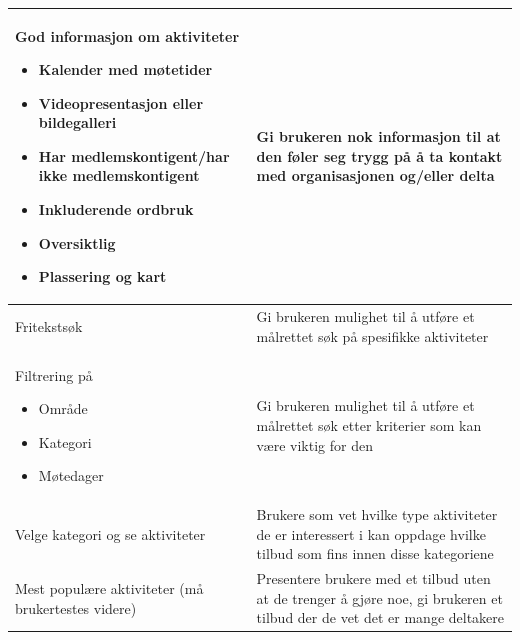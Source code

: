 \begin{center}
\begin{longtabu}{|X|X|}
God informasjon om aktiviteter 
\begin{itemize}
    \item Kalender med møtetider
    \item Videopresentasjon eller bildegalleri
    \item Har medlemskontigent/har ikke medlemskontigent
    \item Inkluderende ordbruk
    \item Oversiktlig
    \item Plassering og kart
\end{itemize}
&  Gi brukeren nok informasjon til at den føler seg trygg på å ta kontakt med organisasjonen og/eller delta\\ \hline

Fritekstsøk
& Gi brukeren mulighet til å utføre et målrettet søk på spesifikke aktiviteter \\ \hline

Filtrering på
\begin{itemize}
    \item Område
    \item Kategori
    \item Møtedager
\end{itemize}
& Gi brukeren mulighet til å utføre et målrettet søk etter kriterier som kan være viktig for den \\ \hline

Velge kategori og se aktiviteter
& Brukere som vet hvilke type aktiviteter de er interessert i kan oppdage hvilke tilbud som fins innen disse kategoriene \\ \hline

Mest populære aktiviteter (må brukertestes videre) 
& Presentere brukere med et tilbud uten at de trenger å gjøre noe, gi brukeren et tilbud der de vet det er mange deltakere \\ \hline

\end{longtabu}
\end{center}

